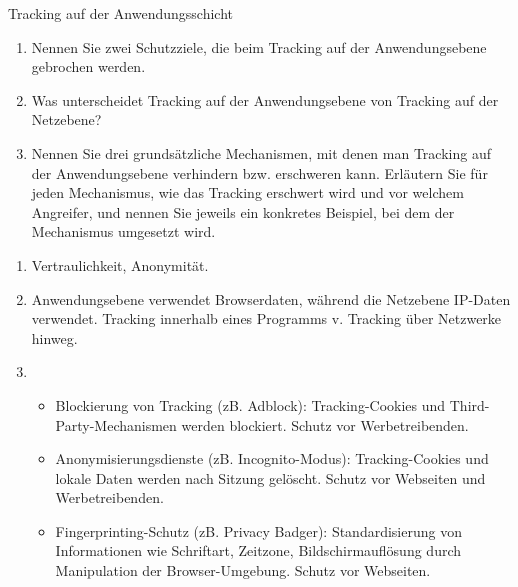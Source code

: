 \documentclass{article}
\begin{document}
\begin{exercise}{Tracking auf der Anwendungsschicht}
  \begin{enumerate}
    \item Nennen Sie zwei Schutzziele, die beim Tracking auf der Anwendungsebene gebrochen werden.
    \item Was unterscheidet Tracking auf der Anwendungsebene von Tracking auf der Netzebene?
    \item Nennen Sie drei grundsätzliche Mechanismen, mit denen man Tracking auf der Anwendungsebene verhindern bzw. erschweren kann. Erläutern Sie für jeden Mechanismus, wie das Tracking erschwert wird und vor welchem Angreifer, und nennen Sie jeweils ein konkretes Beispiel, bei dem der Mechanismus umgesetzt wird.
  \end{enumerate}

  \begin{solution}
    \begin{enumerate}
      \item Vertraulichkeit, Anonymität.
      \item Anwendungsebene verwendet Browserdaten, während die Netzebene IP-Daten verwendet. Tracking innerhalb eines Programms v. Tracking über Netzwerke hinweg.
      \item \begin{itemize}
          \item Blockierung von Tracking (zB. Adblock): Tracking-Cookies und Third-Party-Mechanismen werden blockiert. Schutz vor Werbetreibenden.
          \item Anonymisierungsdienste (zB. Incognito-Modus): Tracking-Cookies und lokale Daten werden nach Sitzung gelöscht. Schutz vor Webseiten und Werbetreibenden.
          \item Fingerprinting-Schutz (zB. Privacy Badger): Standardisierung von Informationen wie Schriftart, Zeitzone, Bildschirmauflösung durch Manipulation der Browser-Umgebung. Schutz vor Webseiten.
        \end{itemize}
    \end{enumerate}
  \end{solution}
\end{exercise}
\end{document}
